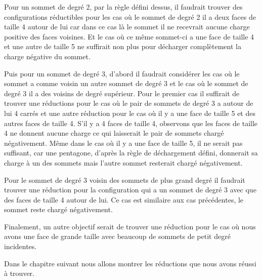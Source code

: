 \documentclass[10pt,a4paper]{article}
\begin{document}


Pour un sommet de degré 2, par la règle défini dessus, il faudrait trouver des configurations réductibles pour les cas où le sommet de degré 2 il a deux faces de taille 4 autour de lui car dans ce cas là le sommet il ne recevrait aucune charge positive des faces voisines. Et le cas où ce même sommet-ci a une face de taille 4 et une autre de taille 5 ne suffirait non plus pour décharger complètement la charge négative du sommet. 

Puis pour un sommet de degré 3, d'abord il faudrait considérer les cas où le sommet a comme voisin un autre sommet de degré 3 et le cas où le sommet de degré 3 il a des voisins de degré supérieur. Pour le premier cas il suffirait de trouver une réductions pour le cas où le pair de sommets de degré 3 a autour de lui 4 carrés et une autre réduction pour le cas où il y a une face de taille 5 et des autres faces de taille 4. S'il y a 4 faces de taille 4, observons que les faces de taille 4 ne donnent aucune charge ce qui laisserait le pair de sommets chargé négativement. Même dans le cas où il y a une face de taille 5, il ne serait pas suffisant, car une pentagone, d'après la règle de déchargement défini, donnerait sa charge à un des sommets mais l'autre sommet resterait chargé négativement.


Pour le sommet de degré 3 voisin des sommets de plus grand degré il faudrait trouver une réduction pour la configuration qui a un sommet de degré 3 avec que des faces de taille 4 autour de lui. Ce cas est similaire aux cas précédentes, le sommet reste chargé négativement.

Finalement, un autre objectif serait de trouver une réduction pour le cas où nous avons une face de grande taille avec beaucoup de sommets de petit degré incidentes. 

Dans le chapitre suivant nous allons montrer les réductions que nous avons réussi à trouver.
\end{document}
